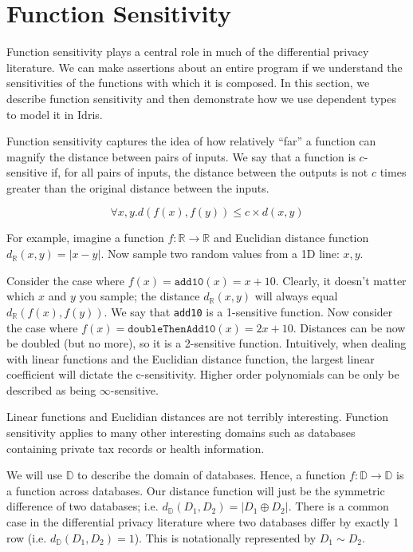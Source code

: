 \documentclass[12pt]{article}
\begin{document}
\section{Function Sensitivity}\label{sec:function_sensitivity}

Function sensitivity plays a central role in much of the differential privacy literature.
We can make assertions about an entire program if we understand the sensitivities of the functions with which it is composed.
In this section, we describe function sensitivity and then demonstrate how we use dependent types to model it in Idris.

Function sensitivity captures the idea of how relatively ``far'' a function can magnify the distance between pairs of inputs.
We say that a function is $c$-sensitive if, for all pairs of inputs, the distance between the outputs is not $c$ times greater than the original distance between the inputs.

	$$ \forall x,y. d(f(x),f(y)) \le c \times d(x,y) $$

For example, imagine a function $f : \mathbb R \rightarrow \mathbb R$ and Euclidian distance function $d_{\mathbb R}(x,y) = |x-y|$.
Now sample two random values from a 1D line: $x,y$.

Consider the case where $f(x) = \texttt{add10}(x) = x + 10$.
Clearly, it doesn't matter which $x$ and $y$ you sample; the distance $d_{\mathbb R}(x,y)$ will always equal $d_{\mathbb R}(f(x),f(y))$.
We say that \texttt{add10} is a 1-sensitive function.
Now consider the case where $f(x) = \texttt{doubleThenAdd10}(x) = 2x + 10$.
Distances can be now be doubled (but no more), so it is a 2-sensitive function.
Intuitively, when dealing with linear functions and the Euclidian distance function, the largest linear coefficient will dictate the c-sensitivity.
Higher order polynomials can be only be described as being $\infty$-sensitive.

Linear functions and Euclidian distances are not terribly interesting.
Function sensitivity applies to many other interesting domains such as databases containing private tax records or health information.

We will use $\mathbb D$ to describe the domain of databases.
Hence, a function $f : \mathbb D \rightarrow \mathbb D$ is a function across databases.
Our distance function will just be the symmetric difference of two databases; i.e. $d_{\mathbb D}(D_1,D_2) = | D_1 \oplus D_2 |$.
There is a common case in the differential privacy literature where two databases differ by exactly 1 row (i.e. $d_{\mathbb D}(D_1,D_2)=1$).
This is notationally represented by $D_1 \sim D_2$.
\end{document}
